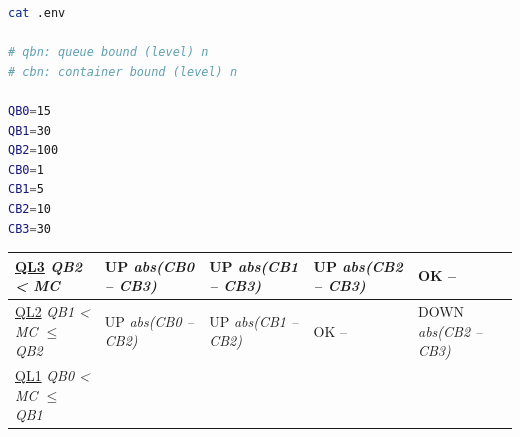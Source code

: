 \renewcommand\theadalign{bc}
\renewcommand\theadfont{\bfseries}
\renewcommand\theadgape{\Gape[4pt]}
\renewcommand\cellgape{\Gape[4pt]}


\begin{lstlisting}[language=bash]
cat .env

# qbn: queue bound (level) n
# cbn: container bound (level) n

QB0=15
QB1=30
QB2=100
CB0=1
CB1=5
CB2=10
CB3=30
\end{lstlisting}


\begin{tabularx}
  {\textwidth}
  { X | X | X | X | X }
  \toprule
      \centering \hspace{4mm} \uline{QL3} \newline \footnotesize \textit{QB2 \textless{} MC} 
    & \centering \hspace{4mm} UP \newline \footnotesize \textit{abs(CB0 -- CB3)} 
    & \centering \hspace{4mm} UP \newline \footnotesize \textit{abs(CB1 -- CB3)} 
    & \centering \hspace{4mm} UP \newline \footnotesize \textit{abs(CB2 -- CB3)} 
    & \centering \hspace{4mm} OK \newline -- 
    \tabularnewline
  \hline
      \centering \hspace{4mm} \uline{QL2} \newline \footnotesize \textit{QB1 \textless{} MC $\leq$ QB2} 
    & \centering \hspace{4mm} UP \newline \footnotesize \textit{abs(CB0 -- CB2)} 
    & \centering \hspace{4mm} UP \newline \footnotesize \textit{abs(CB1 -- CB2)} 
    & \centering \hspace{4mm} OK \newline -- 
    & \centering \hspace{4mm} DOWN \newline \footnotesize \textit{abs(CB2 -- CB3)} 
    \tabularnewline
  \hline
      \centering \hspace{4mm} \uline{QL1} \newline \footnotesize \textit{QB0 \textless{} MC $\leq$ QB1} 

\end{tabularx}
